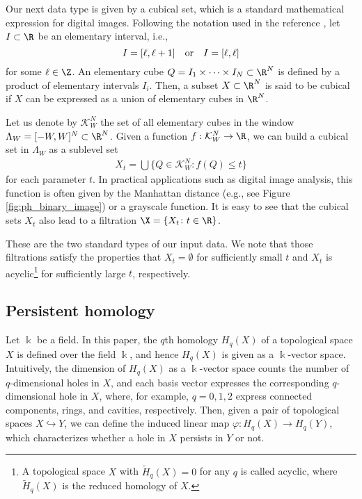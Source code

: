 \documentclass[smallextended]{svjour3}
\begin{document}
Our next data type is given by a cubical set, which is a standard mathematical expression for digital images. Following the notation used in the reference \citep{kmm}, let $I\subset \R$ be an elementary interval, i.e., 
\[
	I=[\ell,\ell+1]\quad {\rm or}\quad I=[\ell,\ell]
\]
for some $\ell\in\Z$. An elementary cube $Q=I_1\times\dots\times I_N\subset \R^N$ is defined by a product of elementary intervals $I_i$. Then, a subset $X\subset \R^N$ is said to be cubical if $X$ can be expressed as a union of elementary cubes in $\R^N$. 

Let us denote by $\mathcal{K}^N_W$ the set of all elementary cubes in the window $\Lambda_W=[-W,W]^N\subset \R^N$. 
Given a function $f:\mathcal{K}_W^N\rightarrow \R$, we can build a cubical set in $\Lambda_W$  as a sublevel set
\begin{align}\label{ref:sublevel}
X_t=\bigcup\{Q\in\mathcal{K}^N_W\colon f(Q)\leq t\}
\end{align}
for each parameter $t$. In practical applications such as digital image analysis, this function is often given by the Manhattan distance (e.g., see Figure \ref{fig:ph_binary_image}) or a grayscale function. It is easy to see that the cubical sets $X_t$ also lead to a filtration $\X=\{X_t\colon t\in\R\}$.


These are the two standard types of our input data.  We note that those filtrations satisfy the properties that $X_t=\emptyset$ for sufficiently small $t$ and $X_t$ is acyclic\footnote{A topological space $X$ with $\tilde H_q(X)=0$ for any $q$ is called acyclic, where $\tilde H_q(X)$ is the reduced homology of $X$.} for sufficiently large $t$, respectively. 





\subsection{Persistent homology}
Let $\Bbbk$ be a field. In this paper, the $q$th homology $H_q(X)$ of a topological space $X$ is defined over the field $\Bbbk$, and hence $H_q(X)$ is given as a $\Bbbk$-vector space. Intuitively, the dimension of $H_q(X)$ as a $\Bbbk$-vector space counts the number of $q$-dimensional holes in $X$, and each basis vector expresses the corresponding $q$-dimensional hole in $X$, where, for example, $q=0,1,2$ express connected components, rings, and cavities, respectively. 
Then, given a pair of topological spaces $X\hookrightarrow Y$, we can define the induced linear map $\varphi: H_q(X)\rightarrow H_q(Y)$, which characterizes whether a hole in $X$ persists in $Y$ or not. 
\end{document}
